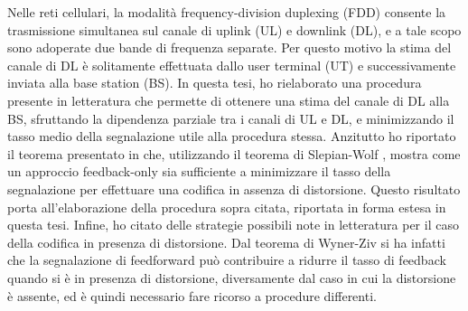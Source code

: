 \newenvironment{abstract}
{\cleardoublepage
\null\vfill
\begin{center}
    \bfseries \abstractname
\end{center}}
{\vfill\null}

\begin{abstract}
    Nelle reti cellulari, la modalità frequency-division duplexing (FDD)
    consente la trasmissione simultanea sul canale di uplink (UL) e downlink
    (DL), e a tale scopo sono adoperate due bande di frequenza separate. Per
    questo motivo la stima del canale di DL è solitamente effettuata dallo user
    terminal (UT) e successivamente inviata alla base station (BS). In questa
    tesi, ho rielaborato una procedura presente in letteratura che permette di
    ottenere una stima del canale di DL alla BS, sfruttando la dipendenza
    parziale tra i canali di UL e DL, e minimizzando il tasso medio della
    segnalazione utile alla procedura stessa. Anzitutto ho riportato il teorema
    presentato in \cite{https://doi.org/10.1002/ett.3628} che, utilizzando il
    teorema di Slepian-Wolf \cite{1055037}, mostra come un approccio
    feedback-only sia sufficiente a minimizzare il tasso della segnalazione per
    effettuare una codifica in assenza di distorsione. Questo risultato porta
    all'elaborazione della procedura sopra citata, riportata in forma estesa in
    questa tesi. Infine, ho citato delle strategie possibili note in
    letteratura per il caso della codifica in presenza di distorsione. Dal
    teorema di Wyner-Ziv \cite{1055508} si ha infatti che la segnalazione di
    feedforward può contribuire a ridurre il tasso di feedback quando si è in
    presenza di distorsione, diversamente dal caso in cui la distorsione è
    assente, ed è quindi necessario fare ricorso a procedure differenti.
\end{abstract}
